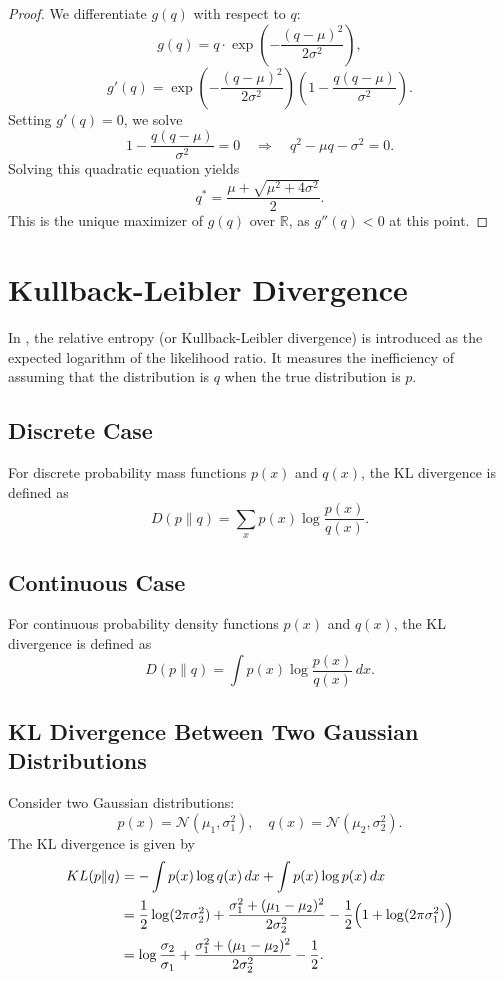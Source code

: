 \documentclass[12pt,a4paper]{report}
\begin{document}
\begin{proof}
We differentiate \( g(q) \) with respect to \( q \):
\[
g(q) = q \cdot \exp\left(-\frac{(q - \mu)^2}{2\sigma^2} \right),
\]
\[
g'(q) = \exp\left(-\frac{(q - \mu)^2}{2\sigma^2} \right) \left( 1 - \frac{q(q - \mu)}{\sigma^2} \right).
\]
Setting \( g'(q) = 0 \), we solve
\[
1 - \frac{q(q - \mu)}{\sigma^2} = 0 \quad \Rightarrow \quad q^2 - \mu q - \sigma^2 = 0.
\]
Solving this quadratic equation yields
\[
q^* = \frac{\mu + \sqrt{\mu^2 + 4\sigma^2}}{2}.
\]
This is the unique maximizer of \( g(q) \) over \( \mathbb{R} \), as \( g''(q) < 0 \) at this point.
\end{proof}


\section*{Kullback-Leibler Divergence} \label{appendix:kl}
In \cite{cover1991}, the relative entropy (or Kullback-Leibler divergence) is introduced as the expected logarithm of the likelihood ratio. It measures the inefficiency of assuming that the distribution is \(q\) when the true distribution is \(p\). 

\subsection*{Discrete Case}
For discrete probability mass functions \(p(x)\) and \(q(x)\), the KL divergence is defined as
\[
D(p\|q)= \sum_{x} p(x) \log \frac{p(x)}{q(x)}.
\]

\subsection*{Continuous Case}
For continuous probability density functions \(p(x)\) and \(q(x)\), the KL divergence is defined as
\[
D(p\|q)= \int p(x) \log \frac{p(x)}{q(x)}\, dx.
\]

\subsection*{KL Divergence Between Two Gaussian Distributions}
Consider two Gaussian distributions:
\[
p(x) = \mathcal{N}(\mu_1,\sigma_1^2), \quad q(x) = \mathcal{N}(\mu_2,\sigma_2^2).
\]
The KL divergence is given by
\[
\begin{aligned}
KL(p\|q) &= -\int p(x)\log q(x)\,dx + \int p(x)\log p(x)\,dx \\
&= \frac{1}{2}\log (2\pi\sigma_2^2) + \frac{\sigma_1^2+(\mu_1-\mu_2)^2}{2\sigma_2^2} - \frac{1}{2}\Bigl(1+\log(2\pi\sigma_1^2)\Bigr) \\
&= \log \frac{\sigma_2}{\sigma_1} + \frac{\sigma_1^2+(\mu_1-\mu_2)^2}{2\sigma_2^2} - \frac{1}{2}.
\end{aligned}
\]
\end{document}
